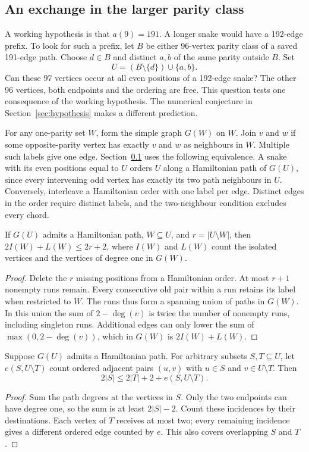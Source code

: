 \subsection{An exchange in the larger parity class}\label{sec:majority237}
A working hypothesis is that $a(9)=191$. A longer snake would have a
192-edge prefix. To look for such a prefix, let $B$ be either 96-vertex
parity class of a saved 191-edge path. Choose $d\in B$ and distinct
$a,b$ of the same parity outside $B$. Set
\[
 U=(B\setminus\{d\})\cup\{a,b\}.
\]
Can these 97 vertices occur at all even positions of a 192-edge snake?
The other 96 vertices, both endpoints and the ordering are free. This
question tests one consequence of the working hypothesis. The numerical
conjecture in Section~\ref{sec:hypothesis} makes a different prediction.

For any one-parity set $W$, form the simple graph $G(W)$ on $W$.
Join $v$ and $w$ if some opposite-parity vertex has exactly $v$ and $w$
as neighbours in $W$. Multiple such labels give one edge.
Section~\ref{sec:majority237} uses the following equivalence. A snake
with its even positions equal to $U$ orders $U$ along a Hamiltonian
path of $G(U)$, since every intervening odd vertex has exactly its two
path neighbours in $U$. Conversely, interleave a Hamiltonian order
with one label per edge. Distinct edges in the order require distinct
labels, and the two-neighbour condition excludes every chord.

\begin{lemma}\label{lem:partial237}
If $G(U)$ admits a Hamiltonian path, $W\subseteq U$, and $r=|U\setminus W|$,
then $2I(W)+L(W)\le 2r+2$, where $I(W)$ and $L(W)$ count the isolated
vertices and the vertices of degree one in $G(W)$.
\end{lemma}
\begin{proof}
Delete the $r$ missing positions from a Hamiltonian order. At most
$r+1$ nonempty runs remain. Every consecutive old pair within a run
retains its label when restricted to $W$. The runs thus form a spanning
union of paths in $G(W)$. In this union the sum of $2-\deg(v)$ is twice
the number of nonempty runs, including singleton runs. Additional edges
can only lower the sum of $\max(0,2-\deg(v))$, which in $G(W)$ is
$2I(W)+L(W)$.
\end{proof}

\begin{lemma}\label{lem:cut237}
Suppose $G(U)$ admits a Hamiltonian path. For arbitrary subsets
$S,T\subseteq U$, let $e(S,U\setminus T)$ count ordered adjacent pairs
$(u,v)$ with $u\in S$ and $v\in U\setminus T$. Then
\[
 2|S|\le 2|T|+2+e(S,U\setminus T).
\]
\end{lemma}
\begin{proof}
Sum the path degrees at the vertices in $S$. Only the two endpoints can
have degree one, so the sum is at least $2|S|-2$. Count these incidences
by their destinations. Each vertex of $T$ receives at most two; every
remaining incidence gives a different ordered edge counted by $e$.
This also covers overlapping $S$ and $T$.
\end{proof}

